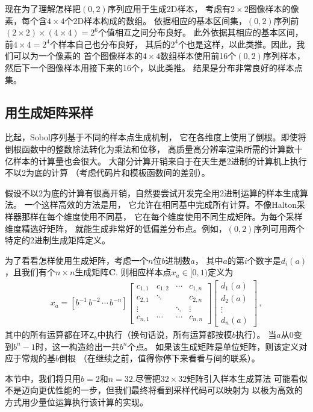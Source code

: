 现在为了理解怎样把$(0,2)$序列应用于生成2D样本，
考虑有$2\times2$图像样本的像素，每个含$4\times4$个2D样本构成的数组。
依据相应的基本区间集，$(0,2)$序列前$(2\times2)\times(4\times4)=2^6$个值相互之间分布良好。
此外依据其相应的基本区间，前$4\times4=2^4$个样本自己也分布良好，
其后的$2^4$个也是这样，以此类推。因此，我们可以为一个像素的
首个图像样本的$4\times4$数组样本使用前16个$(0,2)$序列样本，
然后下一个图像样本用接下来的16个，以此类推。
结果是分布非常良好的样本点集。

\subsection{用生成矩阵采样}\label{sub:用生成矩阵采样}
比起，Sobol序列基于不同的样本点生成机制，
它在各维度上使用了倒根。即使将倒根函数中的整数除法转化为乘法和位移，
高质量高分辨率渲染所需的计算数十亿样本的计算量也会很大。
大部分计算开销来自于在天生是2进制的计算机上执行不以2为底的计算
（考虑代码片和模板函数间的差别）。

假设不以2为底的计算有很高开销，自然要尝试开发完全用2进制运算的样本生成算法。
一个这样高效的方法是用，
它允许在相同基中完成所有计算。不像Halton采样器那样在每个维度使用不同基，
它在每个维度使用不同生成矩阵。为每个采样维度精选好矩阵，
就能生成非常好的低偏差分布点。例如，$(0,2)$序列可用两个特定的2进制生成矩阵定义。

为了看看怎样使用生成矩阵，考虑一个$n$位$b$进制数$a$，
其中$a$的第$i$个数字是$d_i(a)$，且我们有个$n\times n$生成矩阵$\bm C$.
则相应样本点$x_a\in[0,1)$定义为
\begin{align}\label{eq:7.9}
    x_a=[b^{-1}\,b^{-2}\, \cdots\,b^{-n}]\left[
        \begin{array}{cccc}
            c_{1,1} & c_{1,2} & \cdots & c_{1,n} \\
            c_{2,1} & \ddots  &        & c_{2,n} \\
            \vdots  &         & \ddots & \vdots  \\
            c_{n,1} & \cdots  & \cdots & c_{n,n}
        \end{array}
        \right]
    \left[
        \begin{array}{c}
            d_1(a) \\
            d_2(a) \\
            \vdots \\
            d_n(a)
        \end{array}
        \right]\, ,
\end{align}
其中的所有运算都在环$\mathsf{Z}_b$中执行（换句话说，所有运算都按模$b$执行）。
当$a$从0变到$b^n-1$时，这一构造给出一共$b^n$个点。
如果该生成矩阵是单位矩阵，则该定义对应于常规的基$b$倒根
（在继续之前，值得你停下来看看与间的联系）。

本节中，我们将只用$b=2$和$n=32$.尽管把$32\times32$矩阵引入样本生成算法
可能看似不是迈向更优性能的一步，但我们最终将看到采样代码可以映射为
以极为高效的方式用少量位运算执行该计算的实现。